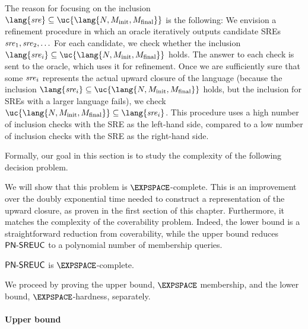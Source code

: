 \documentclass[../../diss.tex]{subfiles}
\begin{document}
The reason for focusing on the inclusion $\lang{\sre} \subseteq \uc{\lang{N,M_\init,M_\final}}$ is the following:
We envision a refinement procedure in which an oracle iteratively outputs candidate SREs $\mathit{sre}_1, \mathit{sre}_2, \ldots$%
For each candidate, we check whether the inclusion $\lang{\sre_i} \subseteq \uc{\lang{N,M_\init,M_\final}}$ holds.
The answer to each check is sent to the oracle, which uses it for refinement.
Once we are sufficiently sure that some $\mathit{sre}_i$ represents the actual upward closure of the language (\eg because the inclusion $\lang{\sre_i} \subseteq \uc{\lang{N,M_\init,M_\final}}$ holds, but the inclusion for SREs with a larger language  fails), we check $\uc{\lang{N,M_\init,M_\final}} \subseteq \lang{\sre_i}$.
This procedure uses a high number of inclusion checks with the SRE as the left-hand side, compared to a low number of inclusion checks with the SRE as the right-hand side.

%
\cheatpagebreak
%

Formally, our goal in this section is to study the complexity of the following decision problem.

\begin{problem}
    \problemshort{($\SREUC$)}
\end{problem}

We will show that this problem is $\EXPSPACE$-complete.
This is an improvement over the doubly exponential time needed to construct a representation of the upward closure, as proven in the first section of this chapter.
Furthermore, it matches the complexity of the coverability problem.
Indeed, the lower bound is a straightforward reduction from coverability, while the upper bound reduces $\SREUC$ to a polynomial number of membership queries.

\begin{theorem}%
\label{Theorem:PNSREUC}%
    $\SREUC$ is $\EXPSPACE$-complete.
\end{theorem}

We proceed by proving the upper bound, \ie $\EXPSPACE$ membership, and the lower bound, $\EXPSPACE$-hardness, separately.

\paragraph{Upper bound}
\end{document}

